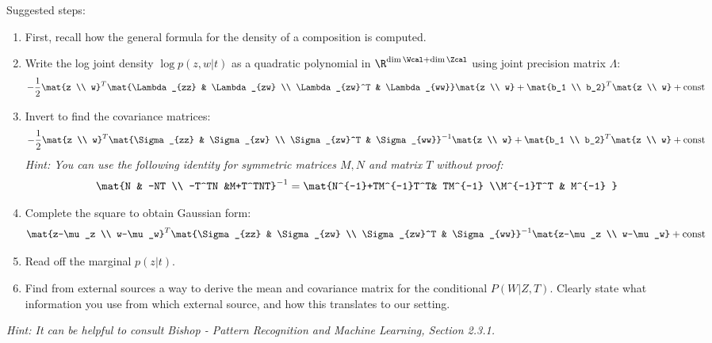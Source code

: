\begin{enumerate}[label=3.\arabic*]
    Suggested steps:
    \begin{enumerate}[label=\roman*)]
        \item First, recall how the general formula for the density of a composition is computed.
        \item Write the log joint density $\log p(z, w|t)$ as a quadratic polynomial in $\R^{\dim \Wcal + \dim \Zcal}$ using joint precision matrix $\Lambda$:
        \[
            -\frac{1}{2} \mat{z \\ w}^T  \mat{\Lambda_{zz} & \Lambda_{zw} \\ \Lambda_{zw}^T & \Lambda_{ww}}\mat{z \\ w} + \mat{b_1 \\ b_2}^T\mat{z \\ w} + \text{const}
        \]
        \item Invert to find the covariance matrices:
        \[
            -\frac{1}{2} \mat{z \\ w}^T  \mat{\Sigma_{zz} & \Sigma_{zw} \\ \Sigma_{zw}^T & \Sigma_{ww}}^{-1}\mat{z \\ w} + \mat{b_1 \\ b_2}^T\mat{z \\ w} + \text{const}
        \]
        \emph{Hint: You can use the following identity for symmetric matrices $M,N$ and matrix $T$ without proof:}
        \begin{align*}
            \mat{N & -NT \\ -T^TN  &M+T^TNT}^{-1} = \mat{N^{-1}+TM^{-1}T^T&  TM^{-1}  \\M^{-1}T^T & M^{-1} }
        \end{align*}
        \item Complete the square to obtain Gaussian form:
        \[
            \mat{z-\mu_z \\ w-\mu_w}^T \mat{\Sigma_{zz} & \Sigma_{zw} \\ \Sigma_{zw}^T & \Sigma_{ww}}^{-1}\mat{z-\mu_z \\ w-\mu_w} + \text{const}
        \]

        \item Read off the marginal $p(z|t)$.

        \item Find from external sources a way to derive the mean and covariance matrix for the conditional $P(W|Z, T)$. Clearly state what information you use from which external source, and how this translates to our setting.
    \end{enumerate}
    \emph{Hint: It can be helpful to consult Bishop - Pattern Recognition and Machine Learning, Section 2.3.1.}


\end{enumerate}
